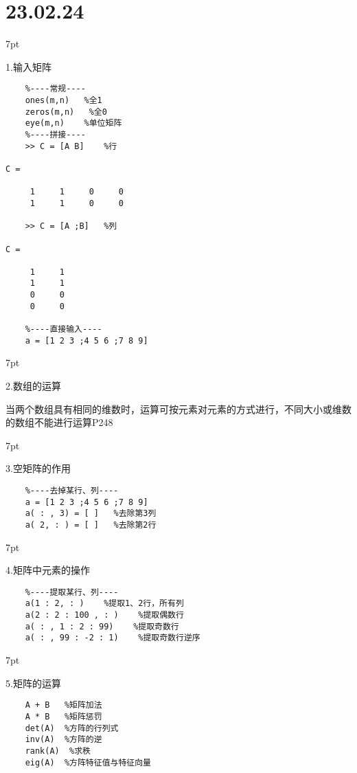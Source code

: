 \documentclass{article} %
\newenvironment{eg}{%
\def\FrameCommand{%
\hspace{1pt}%
{\color{Gray}\vrule width 2pt}%
{\color{egshade}\vrule width 4pt}%
\colorbox{egshade}%
}%
\MakeFramed{\advance\hsize-\width\FrameRestore}%
\noindent\hspace{-4.55pt}%
\begin{adjustwidth}{}{7pt}%
\vspace{2pt}\vspace{2pt}%
\normalfont %
}
{%
\vspace{2pt}\end{adjustwidth}\endMakeFramed%
}
\begin{document}
\noindent \Large \section*{23.02.24} \par \normalsize
\begin{eg}
    1.输入矩阵
\end{eg}
\begin{lstlisting}
    %----常规----
    ones(m,n)   %全1
    zeros(m,n)   %全0
    eye(m,n)    %单位矩阵
    %----拼接----
    >> C = [A B]    %行

C =

     1     1     0     0
     1     1     0     0

    >> C = [A ;B]   %列
 
C =

     1     1
     1     1
     0     0
     0     0

    %----直接输入----
    a = [1 2 3 ;4 5 6 ;7 8 9]
\end{lstlisting}

\begin{eg}
    2.数组的运算

    当两个数组具有相同的维数时，运算可按元素对元素的方式进行，不同大小或维数的数组不能进行运算P248
\end{eg}

\begin{eg}
    3.空矩阵的作用
\end{eg}
\begin{lstlisting}
    %----去掉某行、列----
    a = [1 2 3 ;4 5 6 ;7 8 9]
    a( : , 3) = [ ]   %去除第3列
    a( 2, : ) = [ ]   %去除第2行  
\end{lstlisting}

\begin{eg}
    4.矩阵中元素的操作
\end{eg}
\begin{lstlisting}
    %----提取某行、列----
    a(1 : 2, : )    %提取1、2行，所有列
    a(2 : 2 : 100 , : )    %提取偶数行
    a( : , 1 : 2 : 99)    %提取奇数行
    a( : , 99 : -2 : 1)    %提取奇数行逆序
\end{lstlisting}

\begin{eg}
    5.矩阵的运算
\end{eg}
\begin{lstlisting}
    A + B   %矩阵加法
    A * B   %矩阵惩罚
    det(A)  %方阵的行列式
    inv(A)  %方阵的逆
    rank(A)  %求秩
    eig(A)  %方阵特征值与特征向量
\end{lstlisting}
\end{document}
